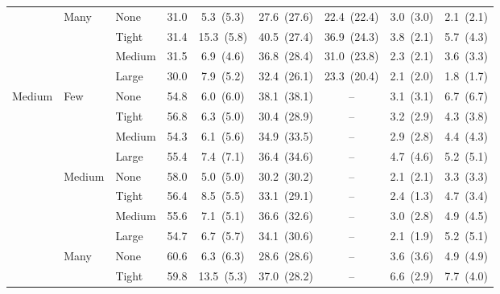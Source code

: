\begin{table}[htbp]
{\begin{tabular}{lll c ccccc}
 & \multirow{4}{*}{\small Many} & {\small None} & 31.0 & 5.3~{\scriptsize(5.3)} & 27.6~{\scriptsize(27.6)} & 22.4~{\scriptsize(22.4)} & 3.0~{\scriptsize(3.0)} & 2.1~{\scriptsize(2.1)} \\
 &  & {\small Tight} & 31.4 & 15.3~{\scriptsize(5.8)} & 40.5~{\scriptsize(27.4)} & 36.9~{\scriptsize(24.3)} & 3.8~{\scriptsize(2.1)} & 5.7~{\scriptsize(4.3)} \\
 &  & {\small Medium} & 31.5 & 6.9~{\scriptsize(4.6)} & 36.8~{\scriptsize(28.4)} & 31.0~{\scriptsize(23.8)} & 2.3~{\scriptsize(2.1)} & 3.6~{\scriptsize(3.3)} \\
 &  & {\small Large} & 30.0 & 7.9~{\scriptsize(5.2)} & 32.4~{\scriptsize(26.1)} & 23.3~{\scriptsize(20.4)} & 2.1~{\scriptsize(2.0)} & 1.8~{\scriptsize(1.7)} \\
\midrule
\multirow{12}{*}{\small Medium} & \multirow{4}{*}{\small Few} & {\small None} & 54.8 & 6.0~{\scriptsize(6.0)} & 38.1~{\scriptsize(38.1)} & -- & 3.1~{\scriptsize(3.1)} & 6.7~{\scriptsize(6.7)} \\
 &  & {\small Tight} & 56.8 & 6.3~{\scriptsize(5.0)} & 30.4~{\scriptsize(28.9)} & -- & 3.2~{\scriptsize(2.9)} & 4.3~{\scriptsize(3.8)} \\
 &  & {\small Medium} & 54.3 & 6.1~{\scriptsize(5.6)} & 34.9~{\scriptsize(33.5)} & -- & 2.9~{\scriptsize(2.8)} & 4.4~{\scriptsize(4.3)} \\
 &  & {\small Large} & 55.4 & 7.4~{\scriptsize(7.1)} & 36.4~{\scriptsize(34.6)} & -- & 4.7~{\scriptsize(4.6)} & 5.2~{\scriptsize(5.1)} \\
 & \multirow{4}{*}{\small Medium} & {\small None} & 58.0 & 5.0~{\scriptsize(5.0)} & 30.2~{\scriptsize(30.2)} & -- & 2.1~{\scriptsize(2.1)} & 3.3~{\scriptsize(3.3)} \\
 &  & {\small Tight} & 56.4 & 8.5~{\scriptsize(5.5)} & 33.1~{\scriptsize(29.1)} & -- & 2.4~{\scriptsize(1.3)} & 4.7~{\scriptsize(3.4)} \\
 &  & {\small Medium} & 55.6 & 7.1~{\scriptsize(5.1)} & 36.6~{\scriptsize(32.6)} & -- & 3.0~{\scriptsize(2.8)} & 4.9~{\scriptsize(4.5)} \\
 &  & {\small Large} & 54.7 & 6.7~{\scriptsize(5.7)} & 34.1~{\scriptsize(30.6)} & -- & 2.1~{\scriptsize(1.9)} & 5.2~{\scriptsize(5.1)} \\
 & \multirow{4}{*}{\small Many} & {\small None} & 60.6 & 6.3~{\scriptsize(6.3)} & 28.6~{\scriptsize(28.6)} & -- & 3.6~{\scriptsize(3.6)} & 4.9~{\scriptsize(4.9)} \\
 &  & {\small Tight} & 59.8 & 13.5~{\scriptsize(5.3)} & 37.0~{\scriptsize(28.2)} & -- & 6.6~{\scriptsize(2.9)} & 7.7~{\scriptsize(4.0)} \\

\end{tabular}}
\end{table}
